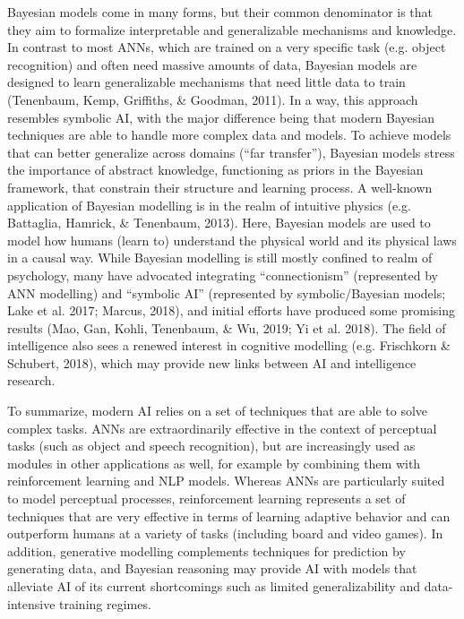 Bayesian models come in many forms, but their common denominator
is that they aim to formalize interpretable and generalizable
mechanisms and knowledge.
In contrast to most ANNs, which are trained on a very specific task
(e.g. object recognition) and often need massive amounts of data,
Bayesian models are designed to learn generalizable mechanisms
that need little data to train
(Tenenbaum, Kemp, Griffiths, \& Goodman, 2011).
In a way, this approach resembles symbolic AI, with the major
difference being that modern Bayesian techniques are able to handle
more complex data and models.
To achieve models that can better generalize across domains
(``far transfer''), Bayesian models stress the importance of
abstract knowledge, functioning as priors in the Bayesian framework,
that constrain their structure and learning process.
A well-known application of Bayesian modelling is in the realm
of intuitive physics
(e.g. Battaglia, Hamrick, \& Tenenbaum, 2013).
Here, Bayesian models are used to model how humans (learn to)
understand the physical world and its physical laws in a causal way.
While Bayesian modelling is still mostly confined to realm of
psychology, many have advocated integrating ``connectionism''
(represented by ANN modelling) and ``symbolic AI'' (represented by
symbolic/Bayesian models; Lake et al. 2017; Marcus, 2018), and initial
efforts have produced some promising results
(Mao, Gan, Kohli, Tenenbaum, \& Wu, 2019; Yi et al. 2018).
The field of intelligence also sees a renewed interest in cognitive
modelling (e.g. Frischkorn \& Schubert, 2018), which may provide
new links between AI and intelligence research.

To summarize, modern AI relies on a set of techniques that are able
to solve complex tasks.
ANNs are extraordinarily effective in the context of perceptual
tasks (such as object and speech recognition), but are increasingly
used as modules in other applications as well, for example by
combining them with reinforcement learning and NLP models.
Whereas ANNs are particularly suited to model perceptual processes,
reinforcement learning represents a set of techniques that are very
effective in terms of learning adaptive behavior and can outperform
humans at a variety of tasks (including board and video games).
In addition, generative modelling complements techniques for
prediction by generating data, and Bayesian reasoning may provide
AI with models that alleviate AI of its current shortcomings such
as limited generalizability and data-intensive training regimes.

